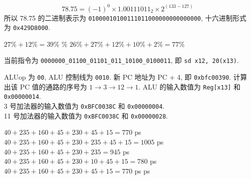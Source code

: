 \documentclass[11pt]{homework}
\begin{document}
\maketitle
\question
$$
78.75 = (-1)^0 \times 1.00111011_2\times 2^{(133-127)}
$$
所以 78.75 的二进制表示为 \texttt{01000010100111011000000000000000}, 十六进制形式为 \texttt{0x429D8000}.
\question
\begin{arabicparts}
    \questionpart $27\% + 12 \% = 39\%$
    \%
    \questionpart $26\% + 27\% + 12\% + 10\% + 2\% = 77\%$
\end{arabicparts}
\question
当前指令为 \texttt{0000000\_01100\_01101\_011\_10100\_0100011}, 即 \texttt{sd x12, 20(x13)}.
\begin{arabicparts}
    \questionpart ALUop 为 \texttt{00}, ALU 控制线为 \texttt{0010}.
    \questionpart 新 PC 地址为 PC + 4, 即 \texttt{0xbfc00390}. 计算出该 PC 值的通路的序号为 $1\to 3\to 12\to 1$.
    \questionpart ALU 的输入数值为 \texttt{Reg[x13]} 和 \texttt{0x00000014}. \\
    3 号加法器的输入数值为 \texttt{0xBFC0038C} 和 \texttt{0x00000004}. \\
    11 号加法器的输入数值为 \texttt{0xBFC0038C} 和 \texttt{0x00000028}.
\end{arabicparts}
\question
\begin{arabicparts}
    \questionpart $40+235+160+45+230+45+15=770$ ps
    \questionpart $40+235+160+45+230+235+45+15=1005$ ps
    \questionpart $40+235+160+45+230+235=945$ ps
    \questionpart $40+235+160+45+230+10+45+15=780$ ps
    \questionpart $40+235+160+45+230+45+15=770$ ps
     ps
\end{arabicparts}
\end{document}
